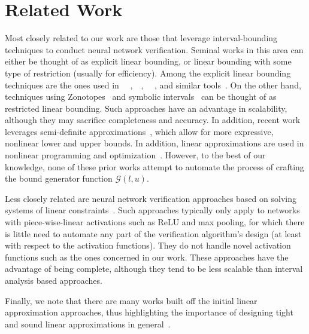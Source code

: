 \section{Related Work}
\label{offlinesyn:sec:related}

Most closely related to our work are those that leverage
interval-bounding techniques to conduct neural network verification.
Seminal works in this area can
either be thought of as explicit linear bounding, or linear bounding
with some type of restriction (usually for efficiency). Among the explicit
linear bounding techniques are the ones used in
~\DeepPoly{}~\cite{SinghGPV19},~\autolipra{}~\cite{autolipra},
~\Neurify{}~\cite{WangPWYJ18nips}, and
similar
tools~\cite{balunovic2019certifying,du2021cert,ko2019popqorn,zhang2018efficient,WengZCSHDBD18,wu2021tightening,ryou2021scalable,shi2020robustness}.
On the other hand,  techniques using Zonotopes~\cite{GehrMDTCV18,MirmanGV18} and
symbolic intervals~\cite{WangPWYJ18} can be thought of as restricted linear
bounding. Such approaches have an advantage in scalability, although they
may sacrifice completeness and accuracy. In addition, recent work leverages
semi-definite approximations~\cite{hu2020reach}, which allow for more
expressive, nonlinear lower and upper bounds. In addition, linear
approximations are used in nonlinear programming and
optimization~\cite{chabert2009contractor,trombettoni2011inner}.
However, to the best of our
knowledge, none of these prior works attempt to automate the process of crafting
the bound generator function $\mathcal{G}(l, u) $.


Less closely related are neural network verification approaches based
on solving systems of linear
constraints~\cite{KatzBDJK17,KatzHIJLLSTWZDK19,Ehlers17,HuangKWW17,BastaniILVNC16,HuangKWW17,baluta2019quantitative,tjeng2019evaluating}.
Such approaches typically only apply to networks with piece-wise-linear
activations such as ReLU and max pooling, for which there is little need to
automate any part of the verification algorithm's design (at least with respect
to the activation functions). They do not handle novel activation functions such as the ones concerned in our work.  These approaches have the advantage of being
complete, although they tend to be less scalable than interval analysis based
approaches.


Finally, we note that there are many works built off the initial linear approximation
approaches, thus highlighting the importance of designing tight and sound linear
approximations in general~\cite{Singh2019krelu,SinghGPV19iclr,WangPWYJ18nips,tran2019star,tran2020verification}.


